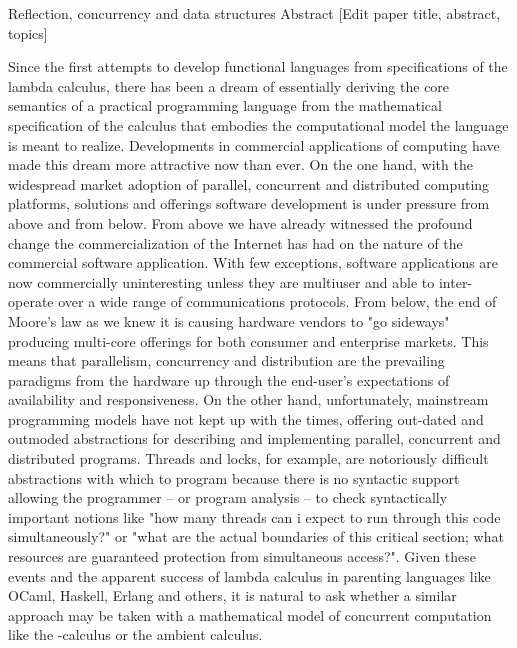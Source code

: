Reflection, concurrency and data structures
Abstract 	[Edit paper title, abstract, topics] 	

Since the first attempts to develop functional languages from
specifications of the lambda calculus, there has been a dream of
essentially deriving the core semantics of a practical programming
language from the mathematical specification of the calculus that
embodies the computational model the language is meant to
realize. Developments in commercial applications of computing have
made this dream more attractive now than ever. On the one hand, with
the widespread market adoption of parallel, concurrent and distributed
computing platforms, solutions and offerings software development is
under pressure from above and from below. From above we have already
witnessed the profound change the commercialization of the Internet
has had on the nature of the commercial software application. With few
exceptions, software applications are now commercially uninteresting
unless they are multiuser and able to inter-operate over a wide range
of communications protocols. From below, the end of Moore's law as we
knew it is causing hardware vendors to "go sideways" producing
multi-core offerings for both consumer and enterprise markets. This
means that parallelism, concurrency and distribution are the
prevailing paradigms from the hardware up through the end-user's
expectations of availability and responsiveness. On the other hand,
unfortunately, mainstream programming models have not kept up with the
times, offering out-dated and outmoded abstractions for describing and
implementing parallel, concurrent and distributed programs. Threads
and locks, for example, are notoriously difficult abstractions with
which to program because there is no syntactic support allowing the
programmer -- or program analysis -- to check syntactically important
notions like "how many threads can i expect to run through this code
simultaneously?" or "what are the actual boundaries of this critical
section; what resources are guaranteed protection from simultaneous
access?". Given these events and the apparent success of lambda
calculus in parenting languages like OCaml, Haskell, Erlang and
others, it is natural to ask whether a similar approach may be taken
with a mathematical model of concurrent computation like the
\pi-calculus or the ambient calculus.

